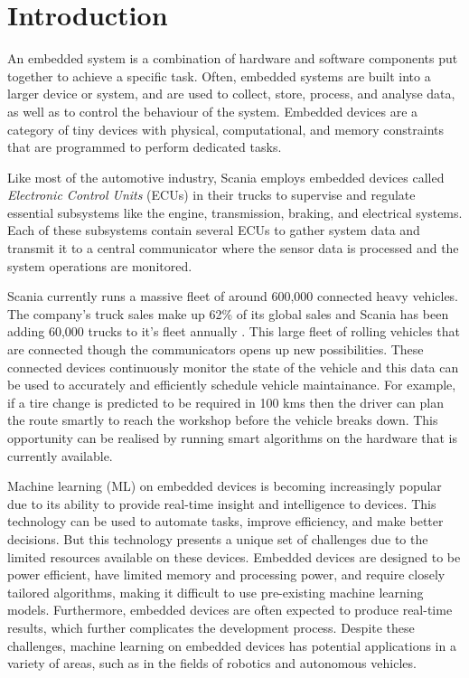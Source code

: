 \part{Introduction}

An embedded system is a combination of hardware and software components put together to achieve a specific task. Often, embedded systems are built into a larger device or system, and are used to collect, store, process, and analyse data, as well as to control the behaviour of the system. Embedded devices are a category of tiny devices with physical, computational, and memory constraints that are programmed to perform dedicated tasks.

Like most of the automotive industry, Scania employs embedded devices called \textit{Electronic Control Units} (ECUs) in their trucks to supervise and regulate essential subsystems like the engine, transmission, braking, and electrical systems. Each of these subsystems contain several ECUs to gather system data and transmit it to a central communicator where the sensor data is processed and the system operations are monitored.

Scania currently runs a massive fleet of around 600,000 connected heavy vehicles. The company's truck sales make up 62\% of its global sales and Scania has been adding 60,000 trucks to it's fleet annually \cite{scania-report}. This large fleet of rolling vehicles that are connected though the communicators opens up new possibilities. These connected devices continuously monitor the state of the vehicle and this data can be used to accurately and efficiently schedule vehicle maintainance. For example, if a tire change is predicted to be required in 100 kms then the driver can plan the route smartly to reach the workshop before the vehicle breaks down. This opportunity can be realised by running smart algorithms on the hardware that is currently available.

Machine learning (ML) on embedded devices is becoming increasingly popular due to its ability to provide real-time insight and intelligence to devices. This technology can be used to automate tasks, improve efficiency, and make better decisions. But this technology presents a unique set of challenges due to the limited resources available on these devices. Embedded devices are designed to be power efficient, have limited memory and processing power, and require closely tailored algorithms, making it difficult to use pre-existing machine learning models. Furthermore, embedded devices are often expected to produce real-time results, which further complicates the development process. Despite these challenges, machine learning on embedded devices has potential applications in a variety of areas, such as in the fields of robotics and autonomous vehicles.


